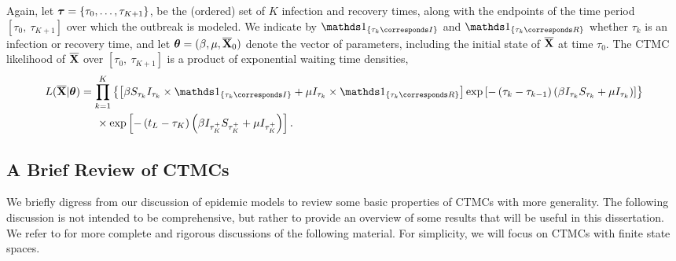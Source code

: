 Again, let $ \boldsymbol{\tau} = \lbrace\tau_0,\dots,\tau_{K+1}\rbrace $, be the (ordered) set of $ K $ infection and recovery times, along with the endpoints of the time period $ [\tau_0,\ \tau_{K+1}] $ over which the outbreak is modeled. We indicate by $ \ind{\tau_k \corresponds I} $ and $ \ind{\tau_k \corresponds R} $ whether $ \tau_k $ is an infection or recovery time, and let $ \boldsymbol{\theta} = (\beta, \mu, \overline{\mathbf{X}}_0) $ denote the vector of parameters, including the initial state of $ \overline{\mathbf{X}} $ at time $ \tau_0 $. The CTMC likelihood of $ \overline{\mathbf{X}} $ over $ [\tau_0,\ \tau_{K+1}] $ is a product of exponential waiting time densities,
\begin{align} 
\label{eqn:sir_pop_likelihood}
L(\overline{\bX}| \btheta) &= \prod_{k = 1}^{K}\left \lbrace \left [\beta S_{\tau_k} I_{\tau_k}\times\ind{\tau_k \corresponds I} + \mu I_{\tau_k}\times\ind{\tau_k \corresponds R}\right ] \exp{\left [-\left (\tau_k - \tau_{k-1}\right )\left (\beta I_{\tau_k} S_{\tau_k} + \mu I_{\tau_k}\right )\right ]}\right \rbrace \nonumber \\
& \hspace{0.2in} \times \exp \left [-\left (t_L - \tau_K\right )\left (\beta I_{\tau_K^+}S_{\tau_K^+} + \mu I_{\tau_K^+}\right )\right ]. 
\end{align} 

\subsection{A Brief Review of CTMCs}
\label{subsec:ctmc_overview}

We briefly digress from our discussion of epidemic models to review some basic properties of CTMCs with more generality. The following discussion is not intended to be comprehensive, but rather to provide an overview of some results that will be useful in this dissertation. We refer to \cite{bremaud1999markov,fuchs2013inference,guttorp1995stochastic,wilkinson2011stochastic} for more complete and rigorous discussions of the following material. For simplicity, we will focus on CTMCs with finite state spaces. 

